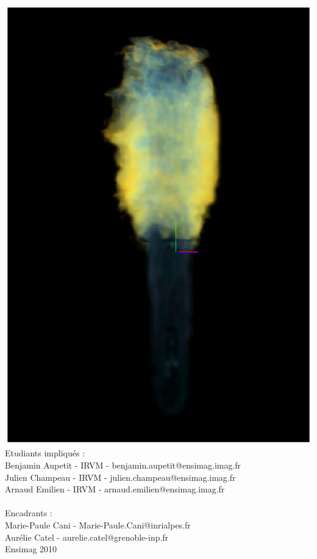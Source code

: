 \documentclass[a4paper,10pt]{article}
\begin{document}
\begin{center}
	\includegraphics[scale=0.4]{FlammeBleue.ps}\\
	\vspace{2cm}
	Etudiants impliqués :\\
	Benjamin Aupetit - IRVM - benjamin.aupetit@ensimag.imag.fr\\
	Julien Champeau - IRVM - julien.champeau@ensimag.imag.fr\\
	Arnaud Emilien - IRVM - arnaud.emilien@ensimag.imag.fr\\
	~\\
	Encadrants :\\
	Marie-Paule Cani  -  Marie-Paule.Cani@inrialpes.fr \\
	Aurélie Catel - aurelie.catel@grenoble-inp.fr
	~ \\
	\vspace{3mm}
	Ensimag 2010\\

\end{center}
\end{document}
